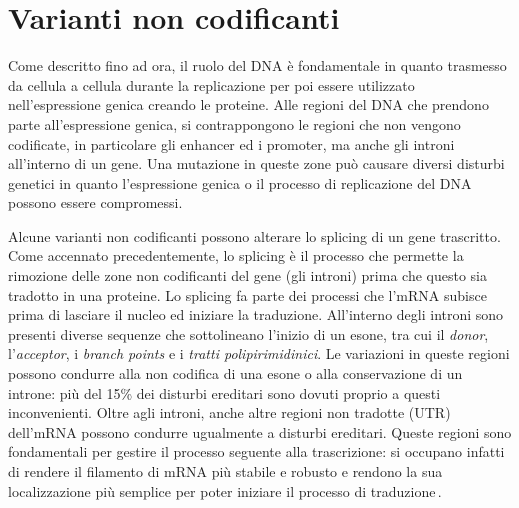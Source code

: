 \section{Varianti non codificanti}

Come descritto fino ad ora, il ruolo del \acs{DNA} è fondamentale in quanto trasmesso da cellula a cellula durante la replicazione per poi essere utilizzato nell'espressione genica creando le proteine. Alle regioni del \acs{DNA} che prendono parte all'espressione genica, si contrappongono le regioni che non vengono codificate, in particolare gli enhancer ed i promoter, ma anche gli introni all'interno di un gene. Una mutazione in queste zone può causare diversi disturbi genetici in quanto l'espressione genica o il processo di replicazione del \acs{DNA} possono essere compromessi.

Alcune varianti non codificanti possono alterare lo splicing di un gene trascritto. Come accennato precedentemente, lo splicing è il processo che permette la rimozione delle zone non codificanti del gene (gli introni) prima che questo sia tradotto in una proteine. Lo splicing fa parte dei processi che l'\acs{mRNA} subisce prima di lasciare il nucleo ed iniziare la traduzione. All'interno degli introni sono presenti diverse sequenze che sottolineano l'inizio di un esone, tra cui il \textit{donor}, l'\textit{acceptor}, i \textit{branch points} e i \textsl{tratti polipirimidinici}. Le variazioni in queste regioni possono condurre alla non codifica di una esone o alla conservazione di un introne: più del 15\% dei disturbi ereditari sono dovuti proprio a questi inconvenienti. Oltre agli introni, anche altre regioni non tradotte (\acs{UTR}) dell'\acs{mRNA} possono condurre ugualmente a disturbi ereditari. Queste regioni sono fondamentali per gestire il processo seguente alla trascrizione: si occupano infatti di rendere il filamento di \acs{mRNA} più stabile e robusto e rendono la sua localizzazione più semplice per poter iniziare il processo di traduzione\,\cite{french2020role}. 










